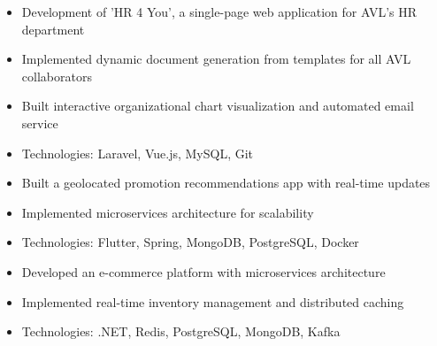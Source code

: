 \documentclass[10pt,a4paper,ragged2e,withhyper]{altacv}
\begin{document}

\makecvheader

\begin{paracol}{2}




\begin{itemize}
\item Development of 'HR 4 You', a single-page web application for AVL's HR department
\item Implemented dynamic document generation from templates for all AVL collaborators
\item Built interactive organizational chart visualization and automated email service
\item Technologies: Laravel, Vue.js, MySQL, Git
\end{itemize}


\begin{itemize}
\item Built a geolocated promotion recommendations app with real-time updates
\item Implemented microservices architecture for scalability
\item Technologies: Flutter, Spring, MongoDB, PostgreSQL, Docker
\end{itemize}

\divider

\begin{itemize}
\item Developed an e-commerce platform with microservices architecture
\item Implemented real-time inventory management and distributed caching
\item Technologies: .NET, Redis, PostgreSQL, MongoDB, Kafka
\end{itemize}


\end{paracol}
\end{document}
